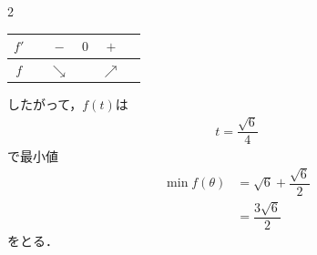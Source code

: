 \documentclass[../../main.tex]{subfiles}
\begin{document}
\begin{multicols}{2}
\begin{table}[H]
\begin{tabular}{|c||c|c|c|c|c|}
      \hline
      $f'$    &               & $-$        & $0$                  & $+$        &                      \\
      \hline
      $f$     &               & $\searrow$ &                      & $\nearrow$ &                      \\
      \hline
    \end{tabular}
  \end{table}
  したがって，$f(t)$は
  \begin{align}
    t=\dfrac{\sqrt{6}}{4}
  \end{align}
  で最小値
  \begin{align}
    \min f(\theta)
    & = \sqrt{6}+\dfrac{\sqrt{6}}{2} \\
    & = \dfrac{3\sqrt{6}}{2}
  \end{align}
  をとる．

  \newpage
\end{multicols}
\end{document}
